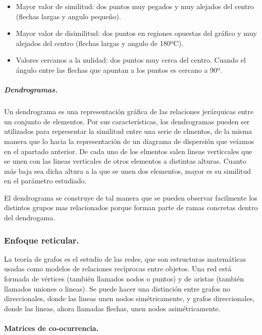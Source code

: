 \documentclass[
]{article}
\providecommand{\tightlist}{%
  \setlength{\itemsep}{0pt}\setlength{\parskip}{0pt}}
\begin{document}
\begin{itemize}
\tightlist
\item
  Mayor valor de similitud: dos puntos muy pegados y muy alejados del
  centro (flechas largas y angulo pequeño).
\item
  Mayor valor de disimilitud: dos puntos en regiones opuestas del
  gráfico y muy alejados del centro (flechas largas y angulo de 180ºC).
\item
  Valores cercanos a la nulidad: dos puntos muy cerca del centro. Cuando
  el ángulo entre las flechas que apuntan a los puntos es cercano a 90º.
\end{itemize}

\hypertarget{dendrogramas.}{%
\subparagraph{Dendrogramas.}\label{dendrogramas.}}

Un dendrograma es una representación gráfica de las relaciones
jerárquicas entre un conjunto de elementos. Por sus características, los
dendrogramas pueden ser utilizados para representar la similitud entre
una serie de elmentos, de la misma manera que lo hacia la representación
de un diagrama de dispersión que veíamos en el apartado anterior. De
cada uno de los elmentos salen lineas verticcales que se unen con las
lineas verticales de otros elementos a distintas alturas. Cuanto más
baja sea dicha altura a la que se unen dos elementos, mayor es su
similitud en el parámetro estudiado.

El dendrograma se construye de tal manera que se pueden observar
facilmente los distintos grupos mas relacionados porque forman parte de
ramas concretas dentro del dendrogama.

\hypertarget{enfoque-reticular.}{%
\subsubsection{Enfoque reticular.}\label{enfoque-reticular.}}

La teoría de grafos es el estudio de las redes, que son estructuras
matemáticas usadas como modelos de relaciones recíprocas entre objetos.
Una red está formada de vértices (también llamados nodos o puntos) y de
aristas (también llamados uniones o lineas). Se puede hacer una
distinción entre grafos no direccionales, donde las lineas unen nodos
simétricamente, y grafos direccionales, donde las lineas, ahora llamadas
flechas, unen nodos asimétricamente.

\hypertarget{matrices-de-co-ocurrencia.}{%
\paragraph{Matrices de
co-ocurrencia.}\label{matrices-de-co-ocurrencia.}}
\end{document}
